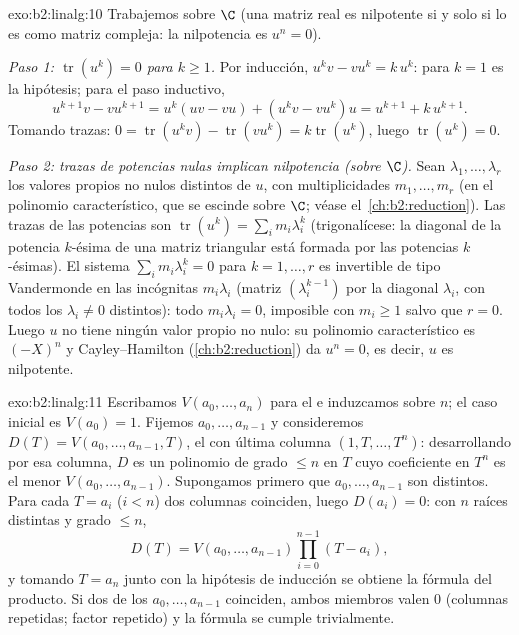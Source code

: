 \begin{solution}{exo:b2:linalg:10}
Trabajemos sobre $\C$ (una matriz real es nilpotente si y solo si lo
es como matriz compleja: la nilpotencia es $u^n = 0$).

\emph{Paso 1: $\operatorname{tr}(u^k) = 0$ para $k \geq 1$.} Por
inducción, $u^k v - v u^k = k\, u^k$: para $k = 1$ es la hipótesis;
para el paso inductivo,
\[
u^{k+1}v - vu^{k+1} = u^k(uv - vu) + (u^k v - v u^k)u
= u^{k+1} + k\,u^{k+1} .
\]
Tomando trazas: $0 = \operatorname{tr}(u^k v) -
\operatorname{tr}(vu^k) = k \operatorname{tr}(u^k)$, luego
$\operatorname{tr}(u^k) = 0$.

\emph{Paso 2: trazas de potencias nulas implican nilpotencia (sobre
$\C$).} Sean $\lambda_1, \dots, \lambda_r$ los valores propios no
nulos distintos de $u$, con multiplicidades $m_1, \dots, m_r$ (en el
polinomio característico, que se escinde sobre $\C$; véase el~\cref{ch:b2:reduction}). Las trazas de las potencias son
$\operatorname{tr}(u^k) = \sum_i m_i \lambda_i^k$ (trigonalícese: la
diagonal de la potencia $k$-ésima de una matriz triangular está
formada por las potencias $k$-ésimas). El sistema $\sum_i m_i
\lambda_i^k = 0$ para $k = 1, \dots, r$ es invertible de tipo
Vandermonde en las incógnitas $m_i\lambda_i$ (matriz
$(\lambda_i^{k-1})$ por la diagonal $\lambda_i$, con todos los
$\lambda_i \neq 0$ distintos): todo $m_i \lambda_i = 0$, imposible
con $m_i \geq 1$ salvo que $r = 0$. Luego $u$ no tiene ningún valor
propio no nulo: su polinomio característico es $(-X)^n$ y
Cayley--Hamilton (\cref{ch:b2:reduction}) da $u^n = 0$, es decir, $u$
es nilpotente.
\end{solution}

\begin{solution}{exo:b2:linalg:11}
Escribamos $V(a_0, \dots, a_n)$ para el  e induzcamos
sobre $n$; el caso inicial es $V(a_0) = 1$. Fijemos $a_0, \dots,
a_{n-1}$ y consideremos $D(T) = V(a_0, \dots, a_{n-1}, T)$, el
 con última columna $(1, T, \dots, T^n)$: desarrollando
por esa columna, $D$ es un polinomio de grado $\leq n$ en $T$ cuyo
coeficiente en $T^n$ es el menor $V(a_0, \dots, a_{n-1})$.
Supongamos primero que $a_0, \dots, a_{n-1}$ son distintos. Para cada
$T = a_i$ ($i < n$) dos columnas coinciden, luego $D(a_i) = 0$: con
$n$ raíces distintas y grado $\leq n$,
\[
D(T) = V(a_0, \dots, a_{n-1}) \prod_{i=0}^{n-1}(T - a_i),
\]
y tomando $T = a_n$ junto con la hipótesis de inducción se obtiene
la fórmula del producto. Si dos de los $a_0, \dots, a_{n-1}$
coinciden, ambos miembros valen $0$ (columnas repetidas; factor
repetido) y la fórmula se cumple trivialmente.
\end{solution}

